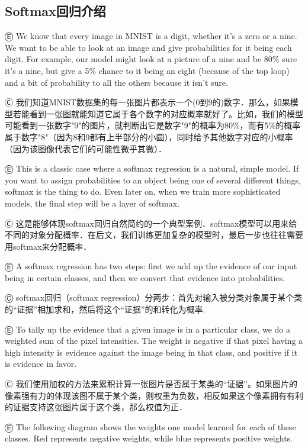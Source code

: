 \subsection {Softmax回归介绍}

Ⓔ We know that every image in MNIST is a digit, whether it's a zero or a nine. We want to be able to look at an image and give probabilities for it being each digit. For example, our model might look at a picture of a nine and be 80\% sure it's a nine, but give a 5\% chance to it being an eight (because of the top loop) and a bit of probability to all the others because it isn't sure.

Ⓒ 我们知道MNIST数据集的每一张图片都表示一个(0到9的)数字．那么，如果模型若能看到一张图就能知道它属于各个数字的对应概率就好了。比如，我们的模型可能看到一张数字"9"的图片，就判断出它是数字"9"的概率为80\%，而有5\%的概率属于数字"8"（因为8和9都有上半部分的小圆），同时给予其他数字对应的小概率（因为该图像代表它们的可能性微乎其微）．

Ⓔ This is a classic case where a softmax regression is a natural, simple model. If you want to assign probabilities to an object being one of several different things, softmax is the thing to do. Even later on, when we train more sophisticated models, the final step will be a layer of softmax.

Ⓒ 这是能够体现softmax回归自然简约的一个典型案例．softmax模型可以用来给不同的对象分配概率．在后文，我们训练更加复杂的模型时，最后一步也往往需要用softmax来分配概率．

Ⓔ A softmax regression has two steps: first we add up the evidence of our input being in certain classes, and then we convert that evidence into probabilities.

Ⓒ softmax回归（softmax regression）分两步：首先对输入被分类对象属于某个类的“证据”相加求和，然后将这个“证据”的和转化为概率.

Ⓔ To tally up the evidence that a given image is in a particular class, we do a weighted sum of the pixel intensities. The weight is negative if that pixel having a high intensity is evidence against the image being in that class, and positive if it is evidence in favor.

Ⓒ 我们使用加权的方法来累积计算一张图片是否属于某类的“证据”。如果图片的像素强有力的体现该图不属于某个类，则权重为负数，相反如果这个像素拥有有利的证据支持这张图片属于这个类，那么权值为正．

Ⓔ The following diagram shows the weights one model learned for each of these classes. Red represents negative weights, while blue represents positive weights.

